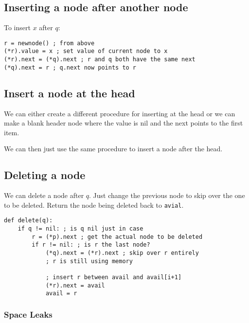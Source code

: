 \subsection{Inserting a node after another node}\label{sub:inserting_a_node_after_another_node}

To insert \(x\) after \(q\):
\begin{verbatim}
r = newnode() ; from above
(*r).value = x ; set value of current node to x
(*r).next = (*q).next ; r and q both have the same next
(*q).next = r ; q.next now points to r
\end{verbatim}

\subsection{Insert a node at the head}\label{sub:insert_a_node_at_the_head}

We can either create a different procedure for inserting at the head or we can make a blank header node where the value is nil and the next points to the first item.

We can then just use the same procedure to insert a node after the head.

\subsection{Deleting a node}\label{sub:deleting_a_node}

We can delete a node after \(q\).
Just change the previous node to skip over the one to be deleted.
Return the node being deleted back to \texttt{avial}.

\begin{verbatim}
def delete(q):
    if q != nil: ; is q nil just in case
        r = (*p).next ; get the actual node to be deleted
        if r != nil: ; is r the last node?
            (*q).next = (*r).next ; skip over r entirely
            ; r is still using memory
            
            ; insert r between avail and avail[i+1]
            (*r).next = avail
            avail = r
\end{verbatim}

\subsubsection{Space Leaks}\label{ssub:space_leaks}

